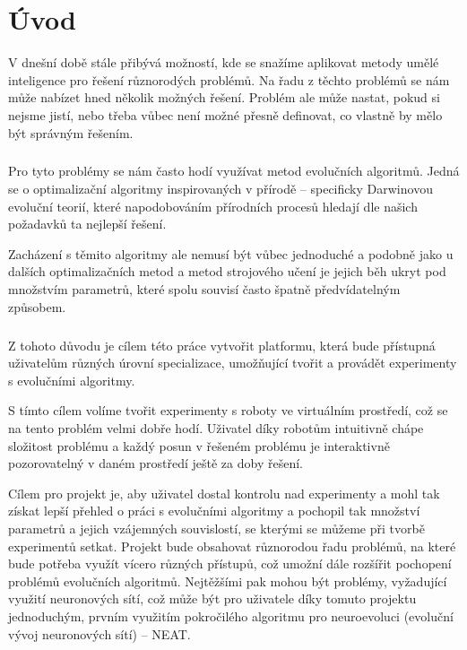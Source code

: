\chapter*{Úvod}

V dnešní době stále přibývá možností, kde se snažíme aplikovat metody umělé
inteligence pro řešení různorodých problémů. Na řadu z těchto problémů se nám
může nabízet hned několik možných řešení. Problém ale může nastat, pokud si
nejsme jistí, nebo třeba vůbec není možné přesně definovat, co vlastně by mělo
být správným řešením.

\paragraph{}
Pro tyto problémy se nám často hodí využívat metod evolučních algoritmů. Jedná
se o optimalizační algoritmy inspirovaných v přírodě -- specificky Darwinovou
evoluční teorií, které napodobováním přírodních procesů hledají dle našich
požadavků ta nejlepší řešení.

Zacházení s těmito algoritmy ale nemusí být vůbec jednoduché a podobně jako u
dalších optimalizačních metod a metod strojového učení je jejich běh ukryt pod
množstvím parametrů, které spolu souvisí často špatně předvídatelným způsobem.

\paragraph{}
Z tohoto důvodu je cílem této práce vytvořit platformu, která bude přístupná
uživatelům různých úrovní specializace, umožňující tvořit a provádět
experimenty s evolučními algoritmy. 

S tímto cílem volíme tvořit experimenty s roboty ve virtuálním prostředí, což
se na tento problém velmi dobře hodí. Uživatel díky robotům intuitivně chápe
složitost problému a každý posun v řešeném problému je interaktivně
pozorovatelný v daném prostředí ještě za doby řešení.

Cílem pro projekt je, aby uživatel dostal kontrolu nad experimenty a mohl tak
získat lepší přehled o práci s evolučními algoritmy a pochopil tak množství
parametrů a jejich vzájemných souvislostí, se kterými se můžeme při tvorbě
experimentů setkat. Projekt bude obsahovat různorodou řadu problémů, na které
bude potřeba využít vícero různých přístupů, což umožní dále rozšířit pochopení
problémů evolučních algoritmů. Nejtěžšími pak mohou být problémy, vyžadující
využití neuronových sítí, což může být pro uživatele díky tomuto projektu
jednoduchým, prvním využitím pokročilého algoritmu pro neuroevoluci (evoluční
vývoj neuronových sítí) -- NEAT.

